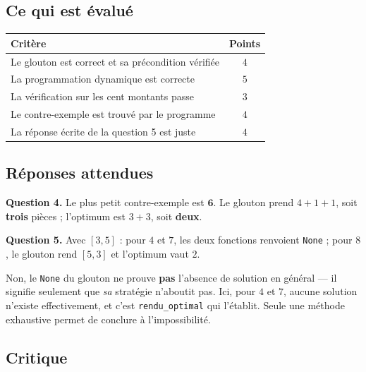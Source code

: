 \subsection*{Ce qui est évalué}

\begin{center}
\begin{tabular}{|l|c|}
\hline
\textbf{Critère} & \textbf{Points} \\
\hline
Le glouton est correct et sa précondition vérifiée & $4$ \\
\hline
La programmation dynamique est correcte & $5$ \\
\hline
La vérification sur les cent montants passe & $3$ \\
\hline
Le contre-exemple est trouvé par le programme & $4$ \\
\hline
La réponse écrite de la question 5 est juste & $4$ \\
\hline
\end{tabular}
\end{center}

\subsection*{Réponses attendues}

\textbf{Question 4.} Le plus petit contre-exemple est $\mathbf{6}$. Le glouton
prend $4 + 1 + 1$, soit \textbf{trois} pièces ; l'optimum est $3 + 3$, soit
\textbf{deux}.

\medskip
\textbf{Question 5.} Avec $[3, 5]$ : pour $4$ et $7$, les deux fonctions
renvoient \lstinline{None} ; pour $8$, le glouton rend $[5, 3]$ et l'optimum
vaut $2$.

Non, le \lstinline{None} du glouton ne prouve \textbf{pas} l'absence de
solution en général — il signifie seulement que \emph{sa} stratégie n'aboutit
pas. Ici, pour $4$ et $7$, aucune solution n'existe effectivement, et c'est
\lstinline{rendu_optimal} qui l'établit. Seule une méthode exhaustive permet de
conclure à l'impossibilité.

\subsection*{Critique}


